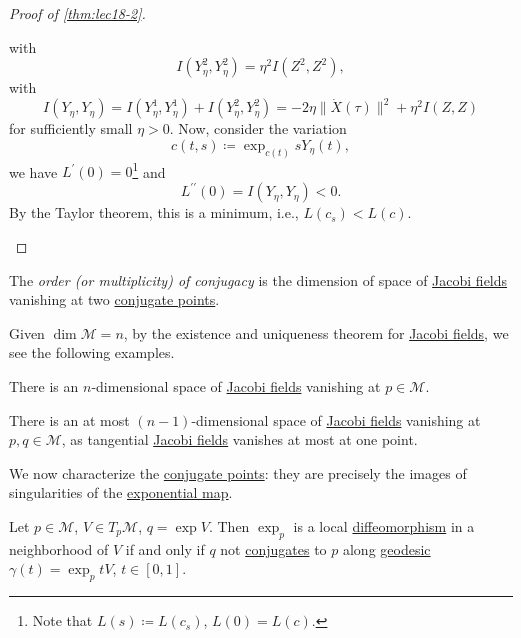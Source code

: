 \begin{proof}[Proof of \autoref{thm:lec18-2}]
\begin{enumerate}[(a)]
\[		      \]
		      with
		      \[
			      I(Y_\eta ^2, Y_\eta ^2) = \eta ^2 I(Z^2, Z^2),
		      \]
		      with
		      \[
			      I(Y_\eta , Y_\eta ) = I(Y_\eta ^1, Y_\eta ^1) + I(Y_\eta ^2, Y_\eta ^2) = -2 \eta \lVert \dot{X} (\tau ) \rVert ^2 + \eta ^2 I(Z, Z)
		      \]
		      for sufficiently small \(\eta > 0\). Now, consider the variation
		      \[
			      c(t, s) \coloneqq \exp _{c(t)} s Y_\eta (t),
		      \]
		      we have \(L^{\prime} (0) = 0\)\footnote{Note that \(L(s) \coloneqq L(c_s)\), \(L(0) = L(c)\).} and
		      \[
			      L^{\prime\prime} (0) = I(Y_\eta , Y_\eta ) < 0.
		      \]
		      By the Taylor theorem, this is a minimum, i.e., \(L(c_s) < L(c)\).
	\end{enumerate}
\end{proof}

\begin{definition}[Order]\label{def:order-o)-conjugacy}
	The \emph{order (or multiplicity) of conjugacy} is the dimension of space of \hyperref[def:Jacobi-field]{Jacobi fields} vanishing at two \hyperref[def:conjugate-point]{conjugate points}.
\end{definition}

Given \(\dim \mathcal{M} = n\), by the existence and uniqueness theorem for \hyperref[def:Jacobi-field]{Jacobi fields}, we see the following examples.
\begin{eg}
	There is an \(n\)-dimensional space of \hyperref[def:Jacobi-field]{Jacobi fields} vanishing at \(p\in \mathcal{M} \).
\end{eg}

\begin{eg}
	There is an at most \((n-1)\)-dimensional space of \hyperref[def:Jacobi-field]{Jacobi fields} vanishing at \(p, q\in \mathcal{M} \), as tangential \hyperref[def:Jacobi-field]{Jacobi fields} vanishes at most at one point.
\end{eg}

We now characterize the \hyperref[def:conjugate-point]{conjugate points}: they are precisely the images of singularities of the \hyperref[def:exponential-map]{exponential map}.

\begin{proposition}
	Let \(p\in \mathcal{M} \), \(V\in T_p \mathcal{M} \), \(q = \exp V\). Then \(\exp _p\) is a local \hyperref[def:diffeomorphism]{diffeomorphism} in a neighborhood of \(V\) if and only if \(q\) not \hyperref[def:conjugate-point]{conjugates} to \(p\) along \hyperref[def:geodesic]{geodesic} \(\gamma (t) = \exp _p tV\), \(t\in [0, 1]\).
\end{proposition}

